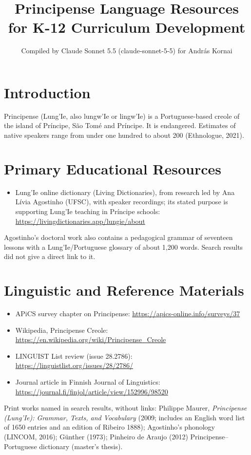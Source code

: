 \documentclass[12pt]{article}
\title{Principense Language Resources for K-12 Curriculum Development}
\author{Compiled by Claude Sonnet 5.5 (claude-sonnet-5-5) for Andr\'as Kornai}
\date{}
\begin{document}
\maketitle

\section{Introduction}
Principense (Lung'Ie, also lungw'Ie or lingw'Ie) is a Portuguese-based creole of the island of Pr\'incipe, S\~ao Tom\'e and Pr\'incipe. It is endangered. Estimates of native speakers range from under one hundred to about 200 (Ethnologue, 2021).

\section{Primary Educational Resources}
\begin{itemize}
\item Lung'Ie online dictionary (Living Dictionaries), from research led by Ana L\'ivia Agostinho (UFSC), with speaker recordings; its stated purpose is supporting Lung'Ie teaching in Pr\'incipe schools: \url{https://livingdictionaries.app/lungie/about}
\end{itemize}
Agostinho's doctoral work also contains a pedagogical grammar of seventeen lessons with a Lung'Ie/Portuguese glossary of about 1,200 words. Search results did not give a direct link to it.

\section{Linguistic and Reference Materials}
\begin{itemize}
\item APiCS survey chapter on Principense: \url{https://apics-online.info/surveys/37}
\item Wikipedia, Principense Creole: \url{https://en.wikipedia.org/wiki/Principense_Creole}
\item LINGUIST List review (issue 28.2786): \url{https://linguistlist.org/issues/28/2786/}
\item Journal article in Finnish Journal of Linguistics: \url{https://journal.fi/finjol/article/view/152996/98520}
\end{itemize}
Print works named in search results, without links: Philippe Maurer, \emph{Principense (Lung'Ie): Grammar, Texts, and Vocabulary} (2009; includes an English word list of 1650 entries and an edition of Ribeiro 1888); Agostinho's phonology (LINCOM, 2016); G\"unther (1973); Pinheiro de Araujo (2012) Principense--Portuguese dictionary (master's thesis).
\end{document}
